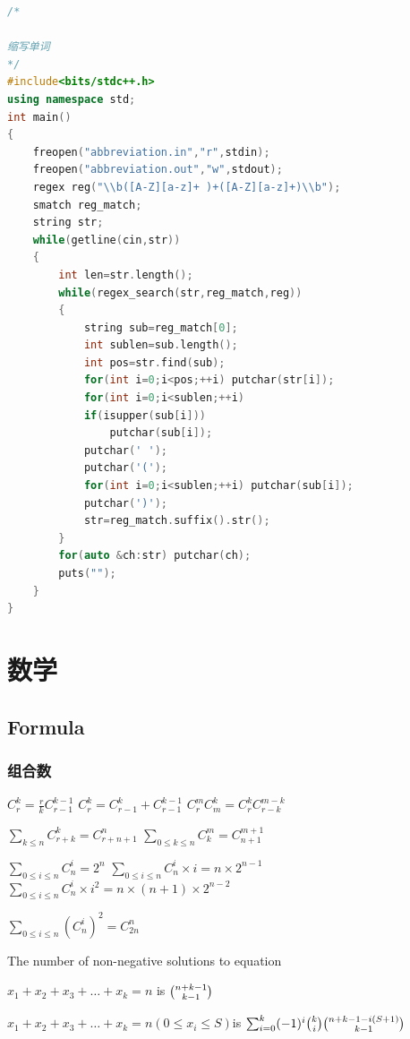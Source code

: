 \documentclass[UTF8,a4paper,titlepage]{ctexart}
\begin{document}
\begin{lstlisting}[language=C++]
/*

缩写单词
*/
#include<bits/stdc++.h>
using namespace std;
int main()
{
    freopen("abbreviation.in","r",stdin);
    freopen("abbreviation.out","w",stdout);
    regex reg("\\b([A-Z][a-z]+ )+([A-Z][a-z]+)\\b");
    smatch reg_match;
    string str;
    while(getline(cin,str))
    {
        int len=str.length();
        while(regex_search(str,reg_match,reg))
        {
            string sub=reg_match[0];
            int sublen=sub.length();
            int pos=str.find(sub);
            for(int i=0;i<pos;++i) putchar(str[i]);
            for(int i=0;i<sublen;++i)
            if(isupper(sub[i]))
                putchar(sub[i]);
            putchar(' ');
            putchar('(');
            for(int i=0;i<sublen;++i) putchar(sub[i]);
            putchar(')');
            str=reg_match.suffix().str();
        }
        for(auto &ch:str) putchar(ch);
        puts("");
    }
}

\end{lstlisting}
\section{数学}
\subsection{Formula}
\subsubsection*{组合数}
$C_r^{k}=\frac{r}{k}C_{r-1}^{k-1}$\qquad
$C_r^{k}=C_{r-1}^{k}+C_{r-1}^{k-1}$\qquad
$C_r^mC_m^k=C_r^kC_{r-k}^{m-k}$\par
$\sum_{k \le n}C_{r+k}^k=C_{r+n+1}^{n}$\qquad
$\sum_{0 \le k \le n}C_{k}^{m}=C_{n+1}^{m+1}$\par
$\sum_{0 \le i \le n}C_n^{i}=2^n$\qquad
$\sum_{0 \le i \le n}C_n^{i}\times i =n\times 2^{n-1}$\qquad
$\sum_{0 \le i \le n}C_n^{i}\times i^2 =n\times(n+1)\times  2^{n-2}$\par
$\sum_{0 \le i \le n}(C_n^{i})^2=C_{2n}^{n}$\par
The number of non-negative solutions to equation\par  $x_1+x_2+x_3+\dots+x_k=n$ is $\tbinom{n+k-1}{k-1}$\par
$x_1+x_2+x_3+\dots+x_k=n (0\le x_i\le S)$is  $\sum_{i=0}^{k}(-1)^i\tbinom{k}{i}\tbinom{n+k-1-i(S+1)}{k-1}$
\end{document}
